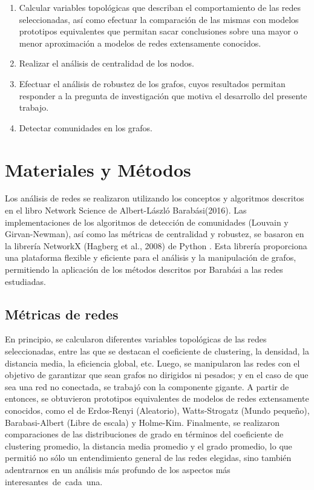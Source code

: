 \documentclass[conference]{IEEEtran}
\begin{document}
\begin{enumerate}
    \item Calcular variables topológicas que describan el comportamiento de las redes seleccionadas, así como efectuar la comparación de las mismas con modelos prototipos equivalentes que permitan sacar conclusiones sobre una mayor o menor aproximación a modelos de redes extensamente conocidos.
    
    \item Realizar el análisis de centralidad de los nodos.
    
    \item Efectuar el análisis de robustez de los grafos, cuyos resultados permitan responder a la pregunta de investigación que motiva el desarrollo del presente trabajo.
    
    \item Detectar comunidades en los grafos.
\end{enumerate}


\vspace{15pt}

\section{Materiales y Métodos}

Los análisis de redes se realizaron utilizando los conceptos y algoritmos descritos en el libro Network Science de Albert-László Barabási\cite{barabasi2016}(2016). Las implementaciones de los algoritmos de detección de comunidades (Louvain y Girvan-Newman), así como las métricas de centralidad y robustez, se basaron en la librería NetworkX (Hagberg et al., 2008) de Python \cite{networkx2008}. Esta librería proporciona una plataforma flexible y eficiente para el análisis y la manipulación de grafos, permitiendo la aplicación de los métodos descritos por Barabási a las redes estudiadas.

\vspace{10pt}

\subsection{{Métricas de redes}}
En principio, se calcularon diferentes variables topológicas de las redes seleccionadas, entre las que se destacan el coeficiente de clustering, la densidad, la distancia media, la eficiencia global, etc. Luego, se manipularon las redes con el objetivo de garantizar que sean grafos no dirigidos ni pesados; y en el caso de que sea una red no conectada, se trabajó con la componente gigante. A partir de entonces, se obtuvieron prototipos equivalentes de modelos de redes extensamente conocidos, como el de Erdos-Renyi (Aleatorio), Watts-Strogatz (Mundo pequeño), Barabasi-Albert (Libre de escala) y Holme-Kim. Finalmente, se realizaron comparaciones de las distribuciones de grado en términos del coeficiente de clustering promedio, la distancia media promedio y el grado promedio, lo que permitió no sólo un entendimiento general de las redes elegidas, sino también adentrarnos en un análisis más profundo de los aspectos más interesantes de cada una.
\end{document}
